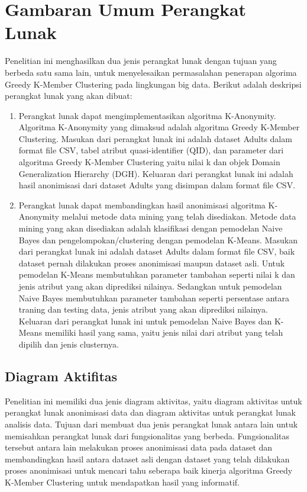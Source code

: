 \section{Gambaran Umum Perangkat Lunak}
Penelitian ini menghasilkan dua jenis perangkat lunak dengan tujuan yang berbeda satu sama lain, untuk menyelesaikan permasalahan penerapan algorima Greedy K-Member Clustering pada lingkungan big data. Berikut adalah deskripsi perangkat lunak yang akan dibuat:

\begin{enumerate}

\item Perangkat lunak dapat mengimplementasikan algoritma K-Anonymity. Algoritma K-Anonymity yang dimaksud adalah algoritma Greedy K-Member Clustering. Masukan dari perangkat lunak ini adalah dataset Adults dalam format file CSV, tabel atribut quasi-identifier (QID), dan parameter dari algoritma Greedy K-Member Clustering yaitu nilai k dan objek Domain Generalization Hierarchy (DGH). Keluaran dari perangkat lunak ini adalah hasil anonimisasi dari dataset Adults yang disimpan dalam format file CSV.

\item Perangkat lunak dapat membandingkan hasil anonimisasi algoritma K-Anonymity melalui metode data mining yang telah disediakan. Metode data mining yang akan disediakan adalah klasifikasi dengan pemodelan Naive Bayes dan pengelompokan/clustering dengan pemodelan K-Means. Masukan dari perangkat lunak ini adalah dataset Adults dalam format file CSV, baik dataset pernah dilakukan proses anonimisasi maupun dataset asli. Untuk pemodelan K-Means membutuhkan parameter tambahan seperti nilai k dan jenis atribut yang akan diprediksi nilainya. Sedangkan untuk pemodelan Naive Bayes membutuhkan parameter tambahan seperti persentase antara traning dan testing data, jenis atribut yang akan diprediksi nilainya. Keluaran dari perangkat lunak ini untuk pemodelan Naive Bayes dan K-Means memiliki hasil yang sama, yaitu jenis nilai dari atribut yang telah dipilih dan jenis clusternya.

\end{enumerate}

\subsection{Diagram Aktifitas}
Penelitian ini memiliki dua jenis diagram aktivitas,  yaitu diagram aktivitas untuk perangkat lunak anonimisasi data dan diagram aktivitas untuk perangkat lunak analisis data. Tujuan dari membuat dua jenis perangkat lunak antara lain untuk memisahkan perangkat lunak dari fungsionalitas yang berbeda. Fungsionalitas tersebut antara lain melakukan proses anonimisasi data pada dataset dan membandingkan hasil antara dataset asli dengan dataset yang telah dilakukan proses anonimisasi untuk mencari tahu seberapa baik kinerja algoritma Greedy K-Member Clustering untuk mendapatkan hasil yang informatif.

